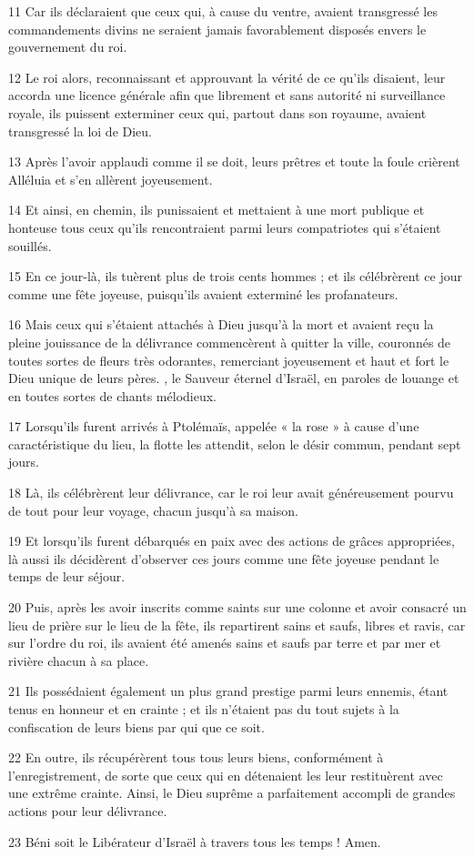 \par 11 Car ils déclaraient que ceux qui, à cause du ventre, avaient transgressé les commandements divins ne seraient jamais favorablement disposés envers le gouvernement du roi.
\par 12 Le roi alors, reconnaissant et approuvant la vérité de ce qu'ils disaient, leur accorda une licence générale afin que librement et sans autorité ni surveillance royale, ils puissent exterminer ceux qui, partout dans son royaume, avaient transgressé la loi de Dieu.
\par 13 Après l'avoir applaudi comme il se doit, leurs prêtres et toute la foule crièrent Alléluia et s'en allèrent joyeusement.
\par 14 Et ainsi, en chemin, ils punissaient et mettaient à une mort publique et honteuse tous ceux qu'ils rencontraient parmi leurs compatriotes qui s'étaient souillés.
\par 15 En ce jour-là, ils tuèrent plus de trois cents hommes ; et ils célébrèrent ce jour comme une fête joyeuse, puisqu'ils avaient exterminé les profanateurs.
\par 16 Mais ceux qui s'étaient attachés à Dieu jusqu'à la mort et avaient reçu la pleine jouissance de la délivrance commencèrent à quitter la ville, couronnés de toutes sortes de fleurs très odorantes, remerciant joyeusement et haut et fort le Dieu unique de leurs pères. , le Sauveur éternel d'Israël, en paroles de louange et en toutes sortes de chants mélodieux.
\par 17 Lorsqu'ils furent arrivés à Ptolémaïs, appelée « la rose » à cause d'une caractéristique du lieu, la flotte les attendit, selon le désir commun, pendant sept jours.
\par 18 Là, ils célébrèrent leur délivrance, car le roi leur avait généreusement pourvu de tout pour leur voyage, chacun jusqu'à sa maison.
\par 19 Et lorsqu'ils furent débarqués en paix avec des actions de grâces appropriées, là aussi ils décidèrent d'observer ces jours comme une fête joyeuse pendant le temps de leur séjour.
\par 20 Puis, après les avoir inscrits comme saints sur une colonne et avoir consacré un lieu de prière sur le lieu de la fête, ils repartirent sains et saufs, libres et ravis, car sur l'ordre du roi, ils avaient été amenés sains et saufs par terre et par mer et rivière chacun à sa place.
\par 21 Ils possédaient également un plus grand prestige parmi leurs ennemis, étant tenus en honneur et en crainte ; et ils n'étaient pas du tout sujets à la confiscation de leurs biens par qui que ce soit.
\par 22 En outre, ils récupérèrent tous tous leurs biens, conformément à l'enregistrement, de sorte que ceux qui en détenaient les leur restituèrent avec une extrême crainte. Ainsi, le Dieu suprême a parfaitement accompli de grandes actions pour leur délivrance.
\par 23 Béni soit le Libérateur d'Israël à travers tous les temps ! Amen.

